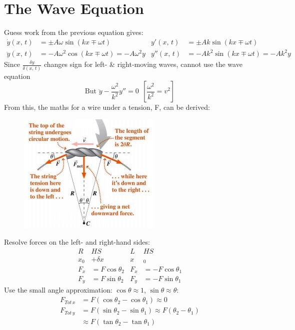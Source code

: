 \documentclass[a4paper, 11pt, normalem]{report}
\begin{document}
\section{The Wave Equation}
Guess work from the previous equation gives:
\begin{align}
    \dot{y}(x,\,t) &= \pm A{\omega}\sin{(kx \mp {\omega}t)}                 & y'(x,\,t) &= \pm Ak\sin{(kx \mp {\omega}t)} \\
    \ddot{y}(x,\,t) &= -A\omega^{2}\cos{(kx \mp {\omega}t)} = -A\omega^{2}y & y''(x,\,t) &= -Ak^{2}\sin{(kx \mp {\omega}t)} = -Ak^{2}y
\end{align}
Since $\frac{\delta y}{\delta(x,\,t)}$ changes sign for left- \& right-moving waves, cannot use the wave equation
\begin{equation}
    \text{But } \ddot{y} - \frac{\omega^{2}}{k^{2}}y'' = 0 ~~[\frac{\omega^{2}}{k^{2}} = v^{2}]
\end{equation}
From this, the maths for a wire under a tension, F, can be derived:
\begin{figure}
    \centering
    \includegraphics{Tension.jpg} 
\end{figure}
Resolve forces on the left- and right-hand sides:
\begin{align}
         R&HS                  &      L&HS                   \\
    x_{0} &+ {\delta}x         &      x&_{0}                 \\
    F_{x} &= F\cos{\theta_{2}} & F_{x} &= -F\cos{\theta_{1}} \\
    F_{y} &= F\sin{\theta_{2}} & F_{y} &= -F\sin{\theta_{1}}
\end{align}
Use the small angle approximation: $\cos{\theta} \approx 1$, $\sin{\theta} \approx \theta$:
\begin{align}
    F_{Tot\,x} &= F(\cos{\theta_{2}} - \cos{\theta_{1}}) \approx 0 \\
    F_{Tot\,y} &= F(\sin{\theta_{2}} - \sin{\theta_{1}}) \approx F(\theta_{2} - \theta_{1}) \\
               &\approx F(\tan{\theta_{2}} - \tan{\theta_{1}})
\end{align}
\end{document}
